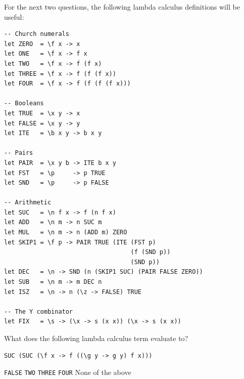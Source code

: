 \documentclass[addpoints]{exam}
\begin{document}
\begin{questions}

\newpage

For the next two questions, the following lambda calculus definitions will be useful:

\begin{verbatim}
-- Church numerals
let ZERO  = \f x -> x
let ONE   = \f x -> f x
let TWO   = \f x -> f (f x)
let THREE = \f x -> f (f (f x))
let FOUR  = \f x -> f (f (f (f x)))

-- Booleans
let TRUE  = \x y -> x
let FALSE = \x y -> y
let ITE   = \b x y -> b x y

-- Pairs
let PAIR  = \x y b -> ITE b x y
let FST   = \p     -> p TRUE
let SND   = \p     -> p FALSE

-- Arithmetic
let SUC   = \n f x -> f (n f x)
let ADD   = \n m -> n SUC m
let MUL   = \n m -> n (ADD m) ZERO
let SKIP1 = \f p -> PAIR TRUE (ITE (FST p)
                                   (f (SND p))
                                   (SND p))
let DEC   = \n -> SND (n (SKIP1 SUC) (PAIR FALSE ZERO))
let SUB   = \n m -> m DEC n
let ISZ   = \n -> n (\z -> FALSE) TRUE

-- The Y combinator
let FIX   = \s -> (\x -> s (x x)) (\x -> s (x x))
\end{verbatim}

\newpage

\question[5] What does the following lambda calculus term evaluate to?

\begin{verbatim}
SUC (SUC (\f x -> f ((\g y -> g y) f x)))
\end{verbatim}

\begin{choices}
\choice \texttt{FALSE}
\choice \texttt{TWO}
\choice \texttt{THREE}
\CorrectChoice \texttt{FOUR}
\choice None of the above
\end{choices}


\end{questions}
\end{document}
